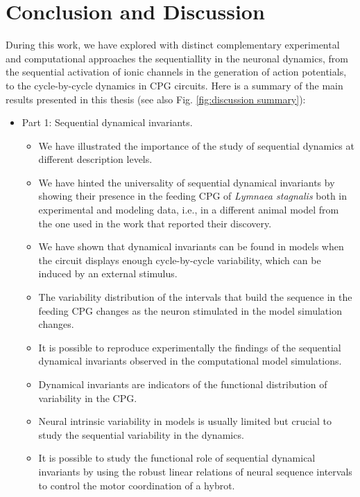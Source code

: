 \chapter{Conclusion and Discussion} %
\label{c-conclusion}

During this work, we have explored with distinct  complementary experimental and computational  approaches the sequentiallity in the neuronal dynamics, from the sequential activation of ionic channels in the generation of action potentials, to the cycle-by-cycle dynamics in CPG circuits. Here is a summary of the main results presented in this thesis (see also Fig. \ref{fig:discussion summary}):

\begin{itemize}
	\item Part 1: Sequential dynamical invariants.
 \begin{itemize}
     \item We have illustrated the importance of the study of sequential dynamics at different description levels.
     \item We have hinted the universality of sequential dynamical invariants by showing their  presence in the feeding CPG of  \textit{Lymnaea stagnalis} both in experimental and modeling data, i.e., in a different animal model from the one used in the work that reported their discovery.
     \item We have shown that dynamical invariants can be found in models when the circuit displays enough cycle-by-cycle  variability, which can be induced by an external stimulus.
     \item The variability distribution of the intervals that build the sequence in the feeding CPG changes as the neuron stimulated in the model simulation changes.
     \item It is possible to reproduce experimentally the findings of the sequential dynamical invariants observed in the computational model simulations.
     \item Dynamical invariants are indicators of the functional distribution of  variability  in the CPG.
     \item Neural intrinsic variability in models is usually limited but crucial to study the sequential variability in the dynamics.
     \item It is possible to study the functional role of sequential dynamical invariants by using  the robust linear relations of neural sequence intervals to control the motor coordination of a hybrot.

\end{itemize}
\end{itemize}
